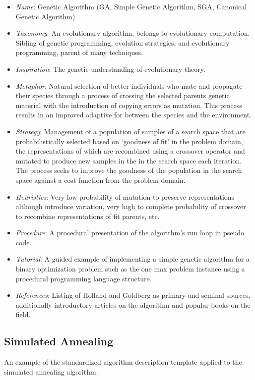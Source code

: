 \documentclass[a4paper, 11pt]{article}
\begin{document}
\begin{itemize}
	\item \emph{Name}: Genetic Algorithm (GA, Simple Genetic Algorithm, SGA, Canonical Genetic Algorithm)
	\item \emph{Taxonomy}: An evolutionary algorithm, belongs to evolutionary computation. Sibling of genetic programming, evolution strategies, and evolutionary programming, parent of many techniques.
	\item \emph{Inspiration}: The genetic understanding of evolutionary theory. 
	\item \emph{Metaphor}: Natural selection of better individuals who mate and propagate their species through a process of crossing the selected parents genetic material with the introduction of copying errors as mutation. This process results in an improved adaptive for between the species and the environment.
	\item \emph{Strategy}: Management of a population of samples of a search space that are probabilistically selected based on `goodness of fit' in the problem domain, the representations of which are recombined using a crossover operator and mutated to produce new samples in the in the search space each iteration. The process seeks to improve the goodness of the population in the search space against a cost function from the problem domain.
	\item \emph{Heuristics}: Very low probability of mutation to preserve representations although introduce variation, very high to complete probability of crossover to recombine representations of fit parents, etc.
	\item \emph{Procedure}: A procedural presentation of the algorithm's run loop in pseudo code.
	\item \emph{Tutorial}: A guided example of implementing a simple genetic algorithm for a binary optimization problem such as the one max problem instance using a procedural programming language structure.
	\item \emph{References}: Listing of Holland and Goldberg as primary and seminal sources, additionally introductory articles on the algorithm and popular books on the field.
\end{itemize}

\subsection{Simulated Annealing}
An example of the standardized algorithm description template applied to the simulated annealing algorithm.
\end{document}
